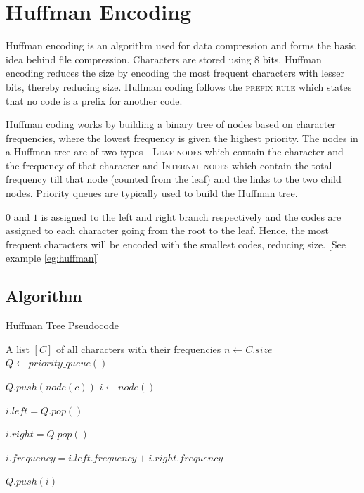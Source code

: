 \documentclass{article}
\begin{document}
\section{Huffman Encoding}
\label{sec:huffman}
Huffman encoding is an algorithm used for data compression and forms the basic idea behind file compression. Characters are stored using 8 bits. Huffman encoding reduces the size by encoding the most frequent characters with lesser bits, thereby reducing size. Huffman coding follows the \textsc{prefix rule} which states that no code is a prefix for another code.

Huffman coding works by building a binary tree of nodes based on character frequencies, where the lowest frequency is given the highest priority. The nodes in a Huffman tree are of two types - \textsc{Leaf nodes} which contain the character and the frequency of that character and \textsc{Internal nodes} which contain the total frequency till that node (counted from the leaf) and the links to the two child nodes. Priority queues are typically used to build the Huffman tree.

$0$ and $1$ is assigned to the left and right branch respectively and the codes are assigned to each character going from the root to the leaf. Hence, the most frequent characters will be encoded with the smallest codes, reducing size. [See example \ref{eg:huffman}]

\subsection{Algorithm}
\begin{algorithm}
\label{algo:huffman}
\caption{Huffman Tree Pseudocode}
\begin{algorithmic}
\REQUIRE A list $[C]$ of all characters with their frequencies
\STATE $n \leftarrow C.size$
\STATE $Q \leftarrow priority\_queue()$ 
\item $Q.push(node(c))$
\ENDFOR
{}
\STATE $i \leftarrow node()$
\item $i.left = Q.pop()$
\item $i.right = Q.pop()$
\item $i.frequency = i.left.frequency + i.right.frequency$
\item $Q.push(i)$
\ENDWHILE
\end{algorithmic}
\end{algorithm}
\end{document}
